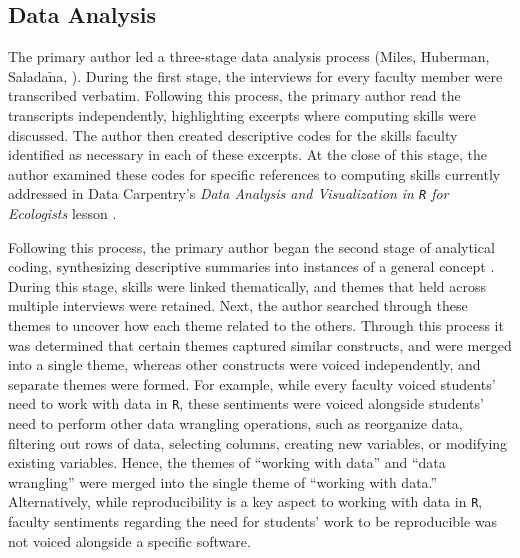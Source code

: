 \documentclass[12pt]{article}
\begin{document}

\subsection{Data Analysis} 

\quad The primary author led a three-stage data analysis process (Miles, 
Huberman, Salada$\tilde{\text{n}}$a, \citeyear{miles}). During the first stage,
the interviews for every faculty member were transcribed verbatim. Following 
this process, the primary author read the transcripts independently, 
highlighting excerpts where computing skills were discussed. The author then 
created descriptive codes for the skills faculty identified as necessary in each
of these excerpts. At the close of this stage, the author examined these codes 
for specific references to computing skills currently addressed in Data 
Carpentry's \emph{Data Analysis and Visualization in \texttt{R} for Ecologists} 
lesson \citep{ecology_curriculum}. 


\quad Following this process, the primary author began the second stage of 
analytical coding, synthesizing descriptive summaries into instances of a
general concept \citep[p.\ 95]{miles}. During this stage, skills were linked
thematically, and themes that held across multiple interviews were retained.
Next, the author searched through these themes to uncover how each theme related
to the others. Through this process it was determined that certain themes 
captured similar constructs, and were merged into a single theme, whereas other
constructs were voiced independently, and separate themes were formed. For
example, while every faculty voiced students' need to work with data in 
\texttt{R}, these sentiments were voiced alongside students' need to perform
other data wrangling operations, such as reorganize data, filtering out rows of
data, selecting columns, creating new variables, or modifying existing
variables. Hence, the themes of ``working with data'' and ``data wrangling''
were merged into the single theme of ``working with data.'' Alternatively, while
reproducibility is a key aspect to working with data in \texttt{R}, faculty
sentiments regarding the need for students' work to be reproducible was not
voiced alongside a specific software.
\end{document}
